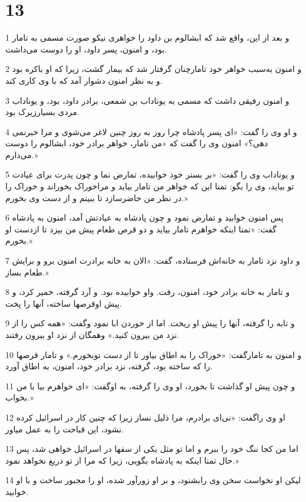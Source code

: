 \chapter{13}

\par 1 و بعد از این، واقع شد که ابشالوم بن داود را خواهری نیکو صورت مسمی به تامار بود، و امنون، پسر داود، او را دوست می‌داشت.
\par 2 و امنون به‌سبب خواهر خود تامارچنان گرفتار شد که بیمار گشت، زیرا که او باکره بود و به نظر امنون دشوار آمد که با وی کاری کند.
\par 3 و امنون رفیقی داشت که مسمی به یوناداب بن شمعی، برادر داود، بود، و یوناداب مردی بسیارزیرک بود.
\par 4 و او وی را گفت: «ای پسر پادشاه چرا روز به روز چنین لاغر می‌شوی و مرا خبرنمی دهی؟» امنون وی را گفت که «من تامار، خواهر برادر خود، ابشالوم را دوست می‌دارم.»
\par 5 و یوناداب وی را گفت: «بر بستر خود خوابیده، تمارض نما و چون پدرت برای عیادت تو بیاید، وی را بگو: تمنا این که خواهر من تامار بیاید و مراخوراک بخوراند و خوراک را در نظر من حاضرسازد تا ببینم و از دست وی بخورم.»
\par 6 پس امنون خوابید و تمارض نمود و چون پادشاه به عیادتش آمد، امنون به پادشاه گفت: «تمنا اینکه خواهرم تامار بیاید و دو قرص طعام پیش من بپزد تا ازدست او بخورم.»
\par 7 و داود نزد تامار به خانه‌اش فرستاده، گفت: «الان به خانه برادرت امنون برو و برایش طعام بساز.»
\par 8 و تامار به خانه برادر خود، امنون، رفت. واو خوابیده بود. و آرد گرفته، خمیر کرد، و پیش اوقرصها ساخته، آنها را پخت.
\par 9 و تابه را گرفته، آنها را پیش او ریخت. اما از خوردن ابا نمود وگفت: «همه کس را از نزد من بیرون کنید.» وهمگان از نزد او بیرون رفتند.
\par 10 و امنون به تامارگفت: «خوراک را به اطاق بیاور تا از دست توبخورم.» و تامار قرصها را که ساخته بود، گرفته، نزد برادر خود، امنون، به اطاق آورد.
\par 11 و چون پیش او گذاشت تا بخورد، او وی را گرفته، به اوگفت: «ای خواهرم بیا با من بخواب.»
\par 12 او وی راگفت: «نی‌ای برادرم، مرا ذلیل نساز زیرا که چنین کار در اسرائیل کرده نشود، این قباحت را به عمل میاور. 
\par 13 اما من کجا ننگ خود را ببرم و اما تو مثل یکی از سفها در اسرائیل خواهی شد، پس حال تمنا اینکه به پادشاه بگویی، زیرا که مرا از تو دریغ نخواهد نمود.»
\par 14 لیکن او نخواست سخن وی رابشنود، و بر او زورآور شده، او را مجبور ساخت و با او خوابید.
